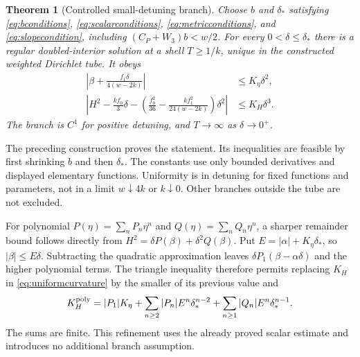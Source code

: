 \documentclass[11pt]{article}
\newtheorem{theorem}{Theorem}
\begin{document}
\begin{theorem}[Controlled small-detuning branch]\label{thm:uniform}
Choose $b$ and $\delta_*$ satisfying \eqref{eq:bconditions}, \eqref{eq:scalarconditions}, \eqref{eq:metricconditions}, and \eqref{eq:slopecondition}, including $(C_P+W_3)b<w/2$. For every $0<\delta\le\delta_*$ there is a regular doubled-interior solution at a shell $T\ge1/k$, unique in the constructed weighted Dirichlet tube. It obeys
\begin{align}
\left|\beta+\frac{f_1\delta}{4(w-2k)}\right|&\le K_\eta\delta^2,\\
\left|H^2-\frac{kf_0}{3}\delta
-\left(\frac{f_0^2}{36}-\frac{kf_1^2}{24(w-2k)}\right)\delta^2\right|
&\le K_H\delta^3.\label{eq:uniformcurvature}
\end{align}
The branch is $C^1$ for positive detuning, and $T\to\infty$ as $\delta\to0^+$.
\end{theorem}
The preceding construction proves the statement. Its inequalities are feasible by first shrinking $b$ and then $\delta_*$. The constants use only bounded derivatives and displayed elementary functions. Uniformity is in detuning for fixed functions and parameters, not in a limit $w\downarrow4k$ or $k\downarrow0$. Other branches outside the tube are not excluded.

For polynomial $P(\eta)=\sum_nP_n\eta^n$ and $Q(\eta)=\sum_nQ_n\eta^n$, a sharper remainder bound follows directly from $H^2=\delta P(\beta)+\delta^2Q(\beta)$. Put $E=|\alpha|+K_\eta\delta_*$, so $|\beta|\le E\delta$. Subtracting the quadratic approximation leaves $\delta P_1(\beta-\alpha\delta)$ and the higher polynomial terms. The triangle inequality therefore permits replacing $K_H$ in \eqref{eq:uniformcurvature} by the smaller of its previous value and
\begin{equation}
K_H^{\rm poly}=|P_1|K_\eta+
\sum_{n\ge2}|P_n|E^n\delta_*^{n-2}
+\sum_{n\ge1}|Q_n|E^n\delta_*^{n-1}.
\label{eq:polynomialbound}
\end{equation}
The sums are finite. This refinement uses the already proved scalar estimate and introduces no additional branch assumption.
\end{document}
